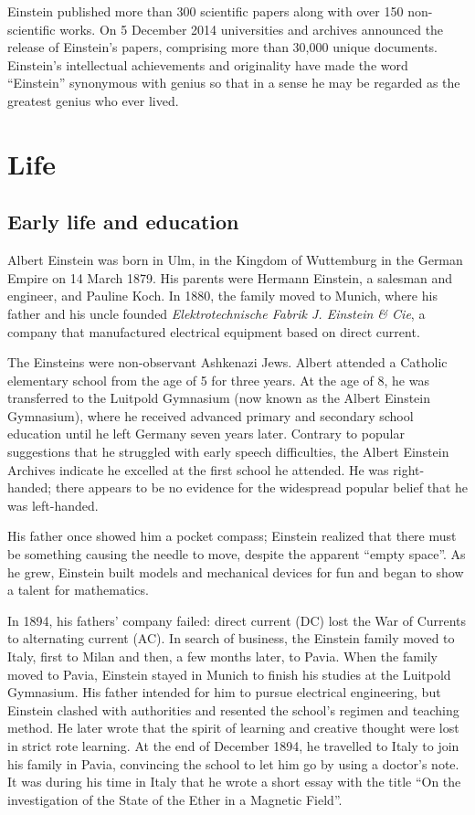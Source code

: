 \documentclass[twoside]{article}
\begin{document}
Einstein published more than 300 scientific papers along with over
150 non-scientific works. On 5 December 2014 universities and
archives announced the release of Einstein's papers, comprising more
than 30,000 unique documents. Einstein's intellectual achievements and
originality have made the word ``Einstein'' synonymous with genius so
that in a sense he may be regarded as the greatest genius who ever lived.

\section{Life}
\subsection{Early life and education}

Albert Einstein was born in Ulm, in the Kingdom of Wuttemburg in
the German Empire on 14 March 1879. His parents were Hermann Einstein,
a salesman and engineer, and Pauline Koch. In 1880, the family moved
to Munich, where his father and his uncle founded
\emph{Elektrotechnische Fabrik J. Einstein \& Cie}, a company that
manufactured electrical equipment based on direct current.

The Einsteins were non-observant Ashkenazi Jews. Albert attended a
Catholic elementary school from the age of 5 for three years. At the
age of 8, he was transferred to the Luitpold Gymnasium (now known as
the Albert Einstein Gymnasium), where he received advanced primary and
secondary school education until he left Germany seven years later.
Contrary to popular suggestions that he struggled with early speech
difficulties, the Albert Einstein Archives indicate he excelled at
the first school he attended. He was right-handed; there appears to
be no evidence for the widespread popular belief that he was left-handed.

His father once showed him a pocket compass; Einstein realized that
there must be something causing the needle to move, despite the apparent
``empty space''. As he grew, Einstein built models and mechanical devices
for fun and began to show a talent for mathematics.

In 1894, his fathers' company failed: direct current (DC) lost the War of
Currents to alternating current (AC). In search of business, the Einstein
family moved to Italy, first to Milan and then, a few months later, to Pavia.
When the family moved to Pavia, Einstein stayed in Munich to finish his
studies at the Luitpold Gymnasium. His father intended for him to pursue
electrical engineering, but Einstein clashed with authorities and resented
the school's regimen and teaching method. He later wrote that the spirit of
learning and creative thought were lost in strict rote learning. At the end
of December 1894, he travelled to Italy to join his family in Pavia,
convincing the school to let him go by using a doctor's note. It was during
his time in Italy that he wrote a short essay with the title ``On the
investigation of the State of the Ether in a Magnetic Field''.
\end{document}
